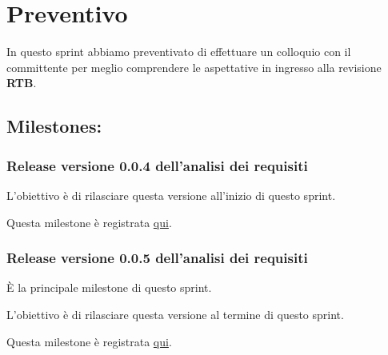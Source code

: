 \section{Preventivo}

In questo sprint abbiamo preventivato di effettuare un colloquio con il committente per meglio comprendere le aspettative in ingresso alla revisione \textbf{RTB}.

\subsection{Milestones:}  
\subsubsection{Release versione 0.0.4 dell'analisi dei requisiti}

L'obiettivo è di rilasciare questa versione all'inizio di questo sprint.

Questa milestone è registrata \href{https://github.com/SWEasabi/analisi-dei-requisiti/milestone/4}{qui}.

\subsubsection{Release versione 0.0.5 dell'analisi dei requisiti}

È la principale milestone di questo sprint.

L'obiettivo è di rilasciare questa versione al termine di questo sprint.

Questa milestone è registrata \href{https://github.com/SWEasabi/analisi-dei-requisiti/milestone/5}{qui}.